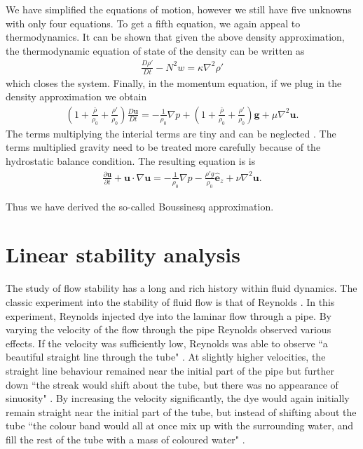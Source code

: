 We have simplified the equations of motion, however we still have five unknowns with only four equations. To get a fifth equation, we again appeal to thermodynamics. It can be shown that given the above density approximation, the thermodynamic equation of state of the density \cite{vallis} can be written as
\begin{align}
\frac{D\rho'}{Dt} - N^{2}w = \kappa \nabla^{2} \rho'
\end{align}
which closes the system. Finally, in the momentum equation, if we plug in the density approximation we obtain
\begin{align} 
\left(1 + \frac{\bar{\rho}}{\rho_{0}} + \frac{\rho'}{\rho_{0}}\right)\frac{D\bm{u}}{Dt} = -\frac{1}{\rho_{0}}\nabla p + \left(1 + \frac{\bar{\rho}}{\rho_{0}} + \frac{\rho'}{\rho_{0}}\right)\textbf{g} + \mu \nabla^{2}\bm{u}.
\end{align}
The terms multiplying the interial terms are tiny and can be neglected \cite{kundu}. The terms multiplied gravity need to be treated more carefully because of the hydrostatic balance condition. The resulting equation is \cite{kundu,vallis} is
\begin{align} 
\frac{\partial \bm{u}}{\partial t} + \bm{u}\cdot \nabla \bm{u} = -\frac{1}{\rho_{0}}\nabla p - \frac{\rho' g}{\rho_{0}}\hat{\bm{e}}_{z} + \nu \nabla^{2}\bm{u}.
\end{align}

Thus we have derived the so-called Boussinesq approximation. 

\section{Linear stability analysis}
The study of flow stability has a long and rich history within fluid dynamics. The classic experiment into the stability of fluid flow is that of  Reynolds \cite{reynolds1883}. In this experiment, Reynolds injected dye into the laminar flow through a pipe. By varying the velocity of the flow through the pipe Reynolds observed various effects. If the velocity was sufficiently low, Reynolds was able to observe ``a beautiful straight line through the tube" \cite{reynolds1883}. At slightly higher velocities, the straight line behaviour remained near the initial part of the pipe but further down ``the streak would shift about the tube, but there was no appearance of sinuosity" \cite{reynolds1883}. By increasing the velocity significantly, the dye would again initially remain straight near the initial part of the tube, but instead of shifting about the tube ``the colour band would all at once mix up with the surrounding water, and fill the rest of the tube with a mass of coloured water" \cite{reynolds1883}.

